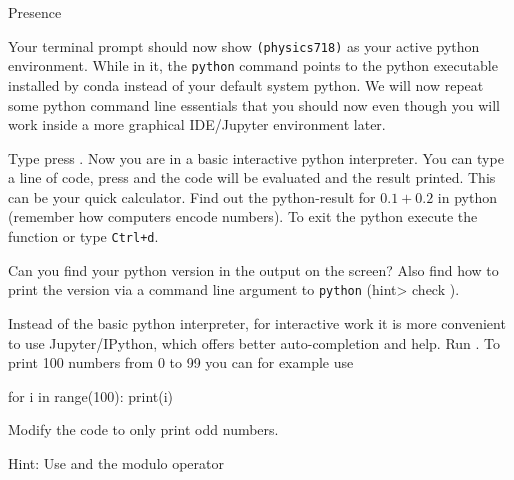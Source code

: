 \documentclass[a4paper]{article}
\begin{document}
\begin{exam}[Presence]{Presence}
\begin{instructions}
\begin{problem*}
      Your terminal prompt should now show \texttt{(physics718)} as your active
      python environment. While in it, the \texttt{python} command points to the
      python executable installed by conda instead of your default system
      python. We will now repeat some python command line essentials that you should
      now even though you will work inside a more graphical IDE/Jupyter
      environment later.

      \begin{parts}
        \item Type  press \keys{\return}. Now you are in a basic
          interactive python interpreter. You can type a line of code, press
          \keys{\return} and the code will be evaluated and the result printed.
          This can be your quick calculator. Find out the python-result for
          $0.1 + 0.2$ in python (remember how computers encode numbers). To exit
          the python execute the  function or type \texttt{Ctrl+d}.
        \item Can you find your python version in the output on the screen? Also
          find how to print the version via a command line argument to
          \texttt{python} (hint> check ).
        \item Instead of the basic python interpreter, for interactive work it
          is more convenient to use Jupyter/IPython, which offers better
          auto-completion and help. Run . To print 100
          numbers from 0 to 99 you can for example use
          \begin{pythoncode}
            for i in range(100):
                print(i)
          \end{pythoncode}

          Modify the code to only print odd numbers.

          Hint: Use  and
          the modulo operator \py{%
          interactively, e.g.\ type \py{9 %
          Also remember that 0's are treated as boolean \py{False} inside
          conditions while all other numbers are \py{True}, you can validate
          this with e.g.\ \py{print(bool(0))} and \py{print(bool(1))}.

}}
\end{parts}
\end{problem*}
\end{instructions}
\end{exam}
\end{document}

